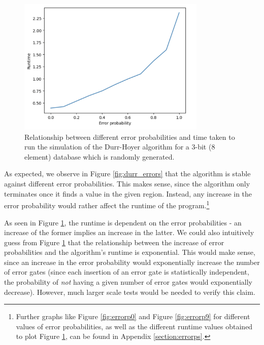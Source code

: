 \documentclass{article}[11pt]
\begin{document}
\begin{figure}[H]
\centering
\includegraphics[width=0.8\textwidth]{Pictures/runtimeplot.png}
\caption{Relationship between different error probabilities and time taken to run the simulation of the Durr-Hoyer algorithm for a 3-bit (8 element) database which is randomly generated.}
\label{fig:runtimeplot}
\end{figure}

As expected, we observe in Figure \ref{fig:durr_errors} that the algorithm is stable against different error probabilities. This makes sense, since the algorithm only terminates once it finds a value in the given region. Instead, any increase in the error probability would rather affect the runtime of the program.\footnote{Further graphs like Figure \ref{fig:errorp0} and Figure \ref{fig:errorp9} for different values of error probabilities, as well as the different runtime values obtained to plot Figure \ref{fig:runtimeplot}, can be found in Appendix \ref{section:errorps}.}

As seen in Figure \ref{fig:runtimeplot}, the runtime is dependent on the error probabilities - an increase of the former implies an increase in the latter. We could also intuitively guess from Figure \ref{fig:runtimeplot} that the relationship between the increase of error probabilities and the algorithm's runtime is exponential. This would make sense, since an increase in the error probability would exponentially increase the number of error gates (since each insertion of an error gate is statistically independent, the probability of \emph{not} having a given number of error gates would exponentially decrease). However, much larger scale tests would be needed to verify this claim.
\end{document}
